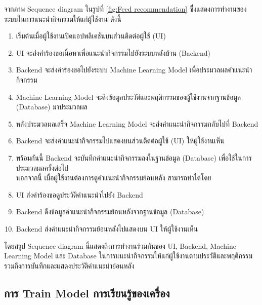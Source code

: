 \documentclass[14pt,oneside,openright,a4paper]{cpe-thai-project}
\begin{document}
  จากภาพ Sequence diagram ในรูปที่ \ref{fig:Feed recommendation} ซึึ่งแสดงการทำงานของระบบในการแนะนำกิจกรรมให้แก่ผู้ใช้งาน ดังนี้
  \begin{enumerate}
    \item เริ่มต้นเมื่อผู้ใช้งานเปิดแอปพลิเคชันบนส่วนติดต่อผู้ใช้ (UI)
    \item UI จะส่งคำร้องขอเนื้อหาเพื่อแนะนำกิจกรรมไปยังระบบหลังบ้าน (Backend)
    \item Backend จะส่งคำร้องขอไปยังระบบ Machine Learning Model เพื่อประมวลผลคำแนะนำกิจกรรม
    \item Machine Learning Model จะดึงข้อมูลประวัติและพฤติกรรมของผู้ใช้งานจากฐานข้อมูล (Database) มาประมวลผล
    \item หลังประมวลผลเสร็จ Machine Learning Model จะส่งคำแนะนำกิจกรรมกลับไปที่ Backend
    \item Backend จะส่งคำแนะนำกิจกรรมไปแสดงบนส่วนติดต่อผู้ใช้ (UI) ให้ผู้ใช้งานเห็น
    \item พร้อมกันนี้ Backend จะบันทึกคำแนะนำกิจกรรมลงในฐานข้อมูล (Database) เพื่อใช้ในการประมวลผลครั้งต่อไป \\
    นอกจากนี้ เมื่อผู้ใช้งานต้องการดูคำแนะนำกิจกรรมย้อนหลัง สามารถทำได้โดย
    \item UI ส่งคำร้องขอดูประวัติคำแนะนำไปยัง Backend
    \item Backend ดึงข้อมูลคำแนะนำกิจกรรมย้อนหลังจากฐานข้อมูล (Database)
    \item Backend ส่งคำแนะนำกิจกรรมย้อนหลังไปแสดงบน UI ให้ผู้ใช้งานเห็น
  \end{enumerate}
  โดยสรุป Sequence diagram นี้แสดงถึงการทำงานร่วมกันของ UI, Backend, Machine Learning Model และ Database ในการแนะนำกิจกรรมให้แก่ผู้ใช้งานตามประวัติและพฤติกรรม รวมถึงการบันทึกและแสดงประวัติคำแนะนำย้อนหลัง

\newpage

\subsection{การ Train Model การเรียนรู้ของเครื่อง}
\end{document}

